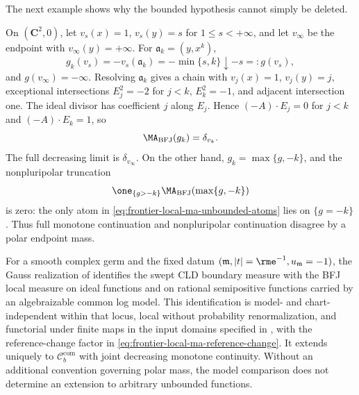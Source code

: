 The next example shows why the bounded hypothesis cannot simply be deleted.

\begin{example}\label{ex:frontier-local-ma-polar-endpoint}
On \((\mathbf C^2,0)\), let
\(v_s(x)=1\), \(v_s(y)=s\) for \(1\leq s<+\infty\), and let
\(v_\infty\) be the endpoint with \(v_\infty(y)=+\infty\).  For
\(\mathfrak a_k=(y,x^k)\),
\begin{equation}
 g_k(v_s)=-v_s(\mathfrak a_k)=-\min\{s,k\}\downarrow-s=:g(v_s),
 \label{eq:frontier-local-ma-unbounded-ray}
\end{equation}
and \(g(v_\infty)=-\infty\).  Resolving \(\mathfrak a_k\) gives a chain with
\(v_j(x)=1\), \(v_j(y)=j\), exceptional intersections
\(E_j^2=-2\) for \(j<k\), \(E_k^2=-1\), and adjacent intersection one.
The ideal divisor has coefficient \(j\) along \(E_j\).  Hence
\((-A)\cdot E_j=0\) for \(j<k\) and
\((-A)\cdot E_k=1\), so
\begin{equation}
                  \MA_{\mathrm{BFJ}}(g_k)=\delta_{v_k}.
 \label{eq:frontier-local-ma-unbounded-atoms}
\end{equation}
The full decreasing limit is \(\delta_{v_\infty}\).  On the other hand,
\(g_k=\max\{g,-k\}\), and the nonpluripolar truncation
\[
 \one_{\{g>-k\}}\MA_{\mathrm{BFJ}}(\max\{g,-k\})
\]
is zero: the only atom in
\eqref{eq:frontier-local-ma-unbounded-atoms} lies on \(\{g=-k\}\).  Thus
full monotone continuation and nonpluripolar continuation disagree by a
polar endpoint mass.
\end{example}

\begin{theorem}\label{thm:frontier-common-local-ma}
For a smooth complex germ and the fixed datum
\((\mathfrak m,|t|=\rme^{-1},u_{\mathfrak m}=-1)\), the Gauss realization
of  identifies the swept CLD boundary
measure with the BFJ local measure on ideal functions and on rational
semipositive functions carried by an algebraizable common log model.  This
identification is model- and chart-independent within that locus, local
without probability renormalization, and functorial under finite maps in the
input domains specified in , with the
reference-change factor in \eqref{eq:frontier-local-ma-reference-change}.
It extends uniquely to
\(\mathcal C_b^{\mathrm{com}}\) with joint decreasing monotone continuity.
Without an additional convention governing polar mass, the model comparison
does not determine an extension to arbitrary unbounded functions.
\end{theorem}

